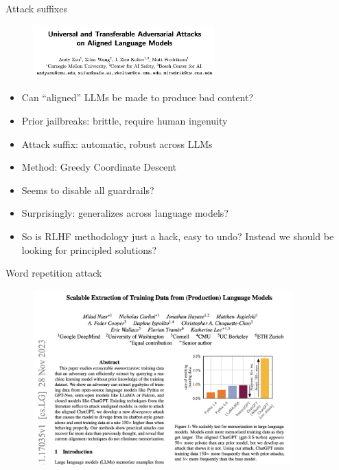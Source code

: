 \begin{vbframe}{Attack suffixes}

\vfill

\begin{figure}
\centering
\includegraphics[width = 7cm]{figure/attacksuffixes.png}
\end{figure}

\begin{itemize}
\item Can ``aligned'' LLMs be made to produce bad content?
\item Prior jailbreaks: brittle, require human ingenuity
\item Attack suffix: automatic, robust across LLMs
\item Method: Greedy Coordinate Descent
	\item Seems to disable all guardrails?
        \item Surprisingly: generalizes across language
        models?
        \item So is RLHF methodology just a  hack, easy to undo?
        Instead we should be looking for principled solutions?
\end{itemize}



\vfill

\end{vbframe}


\begin{vbframe}{Word repetition attack}

\vfill

\begin{figure}
\centering
\includegraphics[width = 10cm]{figure/extractmemory1.png}
\end{figure}




\vfill

\end{vbframe}

